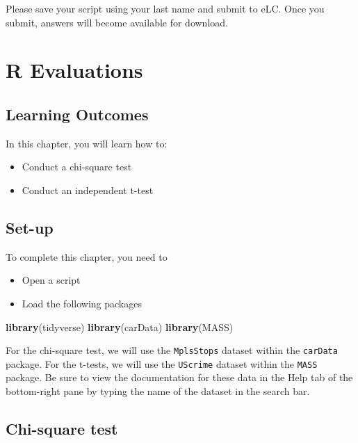 \documentclass[
]{book}
\newenvironment{Shaded}{\begin{snugshade}}{\end{snugshade}}
\newcommand{\KeywordTok}[1]{\textcolor[rgb]{0.13,0.29,0.53}{\textbf{#1}}}
\newcommand{\NormalTok}[1]{#1}
\providecommand{\tightlist}{%
  \setlength{\itemsep}{0pt}\setlength{\parskip}{0pt}}
\begin{document}
Please save your script using your last name and submit to eLC. Once you submit, answers will become available for download.

\hypertarget{r-evaluations}{%
\chapter{R Evaluations}\label{r-evaluations}}

\hypertarget{learning-outcomes}{%
\section{Learning Outcomes}\label{learning-outcomes}}

In this chapter, you will learn how to:

\begin{itemize}
\tightlist
\item
  Conduct a chi-square test
\item
  Conduct an independent t-test
\end{itemize}

\hypertarget{set-up}{%
\section{Set-up}\label{set-up}}

To complete this chapter, you need to

\begin{itemize}
\tightlist
\item
  Open a script
\item
  Load the following packages
\end{itemize}

\begin{Shaded}
\begin{Highlighting}[]
\KeywordTok{library}\NormalTok{(tidyverse)}
\KeywordTok{library}\NormalTok{(carData)}
\KeywordTok{library}\NormalTok{(MASS)}
\end{Highlighting}
\end{Shaded}

For the chi-square test, we will use the \texttt{MplsStops} dataset within the \texttt{carData} package. For the t-tests, we will use the \texttt{UScrime} dataset within the \texttt{MASS} package. Be sure to view the documentation for these data in the Help tab of the bottom-right pane by typing the name of the dataset in the search bar.

\hypertarget{chi-square-test}{%
\section{Chi-square test}\label{chi-square-test}}
\end{document}
